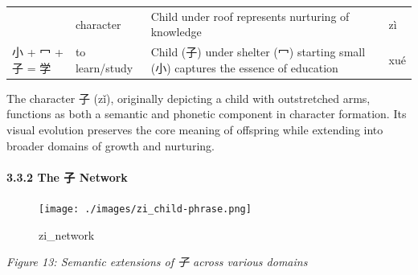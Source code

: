 \begin{longtable}[]{@{}llll@{}}
\begin{minipage}[t]{0.15\columnwidth}
\end{minipage} & \begin{minipage}[t]{0.15\columnwidth}\raggedright
character\strut
\end{minipage} & \begin{minipage}[t]{0.43\columnwidth}\raggedright
Child under roof represents nurturing of knowledge\strut
\end{minipage} & \begin{minipage}[t]{0.15\columnwidth}\raggedright
zì\strut
\end{minipage}\tabularnewline
\begin{minipage}[t]{0.15\columnwidth}\raggedright
小 + 冖 + 子 = 学\strut
\end{minipage} & \begin{minipage}[t]{0.15\columnwidth}\raggedright
to learn/study\strut
\end{minipage} & \begin{minipage}[t]{0.43\columnwidth}\raggedright
Child (子) under shelter (冖) starting small (小) captures the essence
of education\strut
\end{minipage} & \begin{minipage}[t]{0.15\columnwidth}\raggedright
xué\strut
\end{minipage}\tabularnewline
\bottomrule
\end{longtable}

The character 子 (zǐ), originally depicting a child with outstretched
arms, functions as both a semantic and phonetic component in character
formation. Its visual evolution preserves the core meaning of offspring
while extending into broader domains of growth and nurturing.

\hypertarget{the-ux5b50-network}{%
\paragraph{3.3.2 The 子 Network}\label{the-ux5b50-network}}

\begin{figure}
\centering
\texttt{[image: ./images/zi\_child-phrase.png]}
\caption{zi\_network}
\end{figure}

\emph{Figure 13: Semantic extensions of 子 across various domains}


